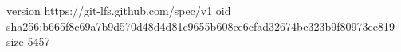 version https://git-lfs.github.com/spec/v1
oid sha256:b665f8c69a7b9d570d48d4d81c9655b608ee6cfad32674be323b9f80973ee819
size 5457
